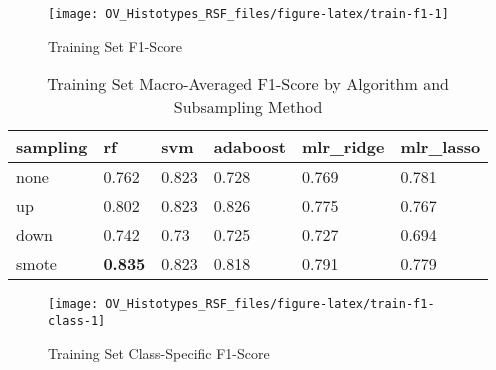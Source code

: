 \documentclass[
]{report}
\begin{document}
\begin{figure}[H]

{\centering \texttt{[image: OV\_Histotypes\_RSF\_files/figure-latex/train-f1-1]} 

}

\caption{Training Set F1-Score}\label{fig:train-f1}
\end{figure}

\begin{table}

\caption{\label{tab:train-f1-table}Training Set Macro-Averaged F1-Score by Algorithm and Subsampling Method}
\centering
\begin{tabular}[t]{l|l|l|l|l|l}
\hline
sampling & rf & svm & adaboost & mlr\_ridge & mlr\_lasso\\
\hline
none & 0.762 & 0.823 & 0.728 & 0.769 & 0.781\\
\hline
up & 0.802 & 0.823 & 0.826 & 0.775 & 0.767\\
\hline
down & 0.742 & 0.73 & 0.725 & 0.727 & 0.694\\
\hline
smote & \textbf{0.835} & 0.823 & 0.818 & 0.791 & 0.779\\
\hline
\end{tabular}
\end{table}

\begin{figure}[H]

{\centering \texttt{[image: OV\_Histotypes\_RSF\_files/figure-latex/train-f1-class-1]} 

}

\caption{Training Set Class-Specific F1-Score}\label{fig:train-f1-class}
\end{figure}
\end{document}
